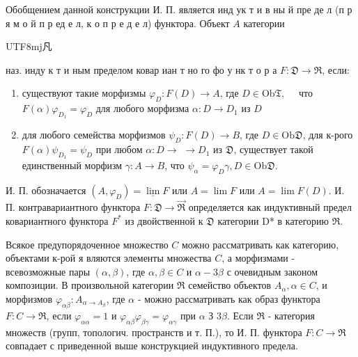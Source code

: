 \documentclass[10pt]{article}
\begin{document}
Обобщением данной конструкции И. П. является инд ук т и в ны й пре де л (п р я м о й п р ед е л, к о п р е д е л) функтора. Объект $A$ категории \begin{CJK}{UTF8}{mj}凡\end{CJK} наз. инду к т и ным пределом ковар иан т но го фо у нк т о р а $F: \mathfrak{D} \rightarrow \Re$, если:



\begin{enumerate}

  \item существуют такие морфизмы $\varphi_{D}: F(D) \rightarrow A$, где $D \in \mathrm{Ob} \mathfrak{T}, \quad$ что $F(\alpha) \varphi_{D_{1}}=\varphi_{D}$ для любого морфизма $\alpha: D \rightarrow D_{1}$ из $D$



  \item для любого семейства морфизмов $\psi_{D}: F(D) \rightarrow B$, где $D \in \mathrm{Ob} \mathfrak{D}$, для к-рого $F(\alpha) \psi_{D_{1}}=\psi_{D}$ при любом $\alpha: D \rightarrow$ $\rightarrow D_{1}$ из $\mathfrak{D}$, существует такой единственный морфизм $\gamma: A \rightarrow B$, что $\psi_{\alpha}=\varphi_{D} \gamma, D \in \mathrm{Ob} \mathfrak{D}$.



\end{enumerate}



И. П. обозначается $\left(A, \varphi_{D}\right)=\underline{\lim } F$ или $A=\lim F$ или $A=\lim F(D)$. И. П. контравариантного функтора $F: \mathfrak{D} \rightarrow \vec{\Re}$ определяется как индуктивный предел ковариантного функтора $F^{*}$ из двойственной к $\mathfrak{D}$ категории D* в категорию $\mathfrak{R}$.



Всякое предупорядоченное множество $C$ можно рассматривать как категорию, объектами к-рой я вляются элементы множества $C$, а морфизмами - всевозможные пары $(\alpha, \beta)$, где $\alpha, \beta \in C$ и $\alpha-3 \beta$ с очевидным законом композиции. В произвольной категории $\mathfrak{\Re}$ семейство объектов $A_{\alpha}, \alpha \in C$, и морфизмов $\varphi_{\alpha \beta}: A_{\alpha \rightarrow A_{\beta}}$, где $\alpha$ - можно рассматривать как образ функтора $F: C \rightarrow \Re$, если $\varphi_{\alpha \alpha}=1$ и $\varphi_{\alpha \beta} \varphi_{\beta \gamma}=\varphi_{\alpha \gamma}$ при $\alpha$ З $3 \beta$. Если $\Re$ - категория множеств (групп, топологич. пространств и т. П.), то И. П. функтора $F: C \rightarrow \Re$ совпадает с приведенной выше конструкцией индуктивного предела.
\end{document}
